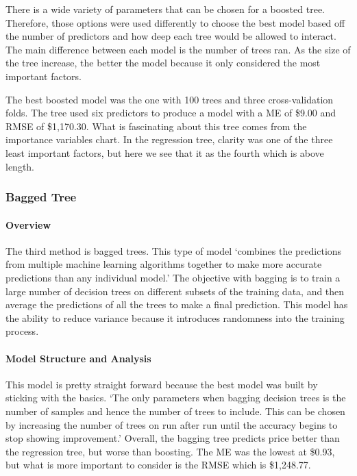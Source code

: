 \documentclass[
  paper=a4,
  ,captions=tableheading
]{scrartcl}
\begin{document}
There is a wide variety of parameters that can be chosen for a boosted
tree. Therefore, those options were used differently to choose the best
model based off the number of predictors and how deep each tree would be
allowed to interact. The main difference between each model is the
number of trees ran. As the size of the tree increase, the better the
model because it only considered the most important factors.

The best boosted model was the one with 100 trees and three
cross-validation folds. The tree used six predictors to produce a model
with a ME of \$9.00 and RMSE of \$1,170.30. What is fascinating about
this tree comes from the importance variables chart. In the regression
tree, clarity was one of the three least important factors, but here we
see that it as the fourth which is above length.

\hypertarget{bagged-tree}{%
\subsubsection{Bagged Tree}\label{bagged-tree}}

\hypertarget{overview-2}{%
\paragraph{Overview}\label{overview-2}}

The third method is bagged trees. This type of model `combines the
predictions from multiple machine learning algorithms together to make
more accurate predictions than any individual model.' The objective with
bagging is to train a large number of decision trees on different
subsets of the training data, and then average the predictions of all
the trees to make a final prediction. This model has the ability to
reduce variance because it introduces randomness into the training
process.

\hypertarget{model-structure-and-analysis-2}{%
\paragraph{Model Structure and
Analysis}\label{model-structure-and-analysis-2}}

This model is pretty straight forward because the best model was built
by sticking with the basics. `The only parameters when bagging decision
trees is the number of samples and hence the number of trees to include.
This can be chosen by increasing the number of trees on run after run
until the accuracy begins to stop showing improvement.' Overall, the
bagging tree predicts price better than the regression tree, but worse
than boosting. The ME was the lowest at \$0.93, but what is more
important to consider is the RMSE which is \$1,248.77.
\end{document}
